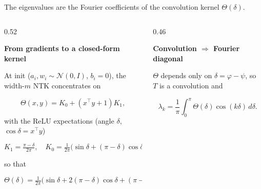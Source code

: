 \documentclass[aspectratio=169,9pt]{beamer}
\begin{document}
\begin{frame}[noframenumbering]
	{\textcolor{muted}{The eigenvalues are the Fourier coefficients of the convolution kernel $\Theta(\delta)$.}}

	\vspace{1.5mm}
	\begin{columns}[T,onlytextwidth]
		\begin{column}{0.52\textwidth}
			\begin{whitecard}[height=46mm]
				{\scriptsize\bfseries From gradients to a closed-form kernel}\par\vspace{1mm}
				{\scriptsize At init ($a_i,w_i\sim\mathcal N(0,I)$, $b_i=0$), the width-$m$ NTK concentrates on}\par\vspace{-1.5mm}
				{\scriptsize
					\[
						\Theta(x,y)=K_0+(x^\top y+1)K_1,
					\]
				}
				\vspace{-3mm}\par
				{\scriptsize with the ReLU expectations (angle $\delta$, $\cos\delta=x^\top y$)}\par\vspace{-1.5mm}
				{\scriptsize
					\[
						K_1=\tfrac{\pi-\delta}{2\pi},
						\quad
						K_0=\tfrac{1}{2\pi}\bigl(\sin\delta+(\pi-\delta)\cos\delta\bigr),
					\]
				}
				\vspace{-3mm}\par
				{\scriptsize so that}\par\vspace{-2mm}
				{\scriptsize
					\[
						\Theta(\delta)=\tfrac{1}{2\pi}\bigl(\sin\delta+2(\pi-\delta)\cos\delta+(\pi-\delta)\bigr).
					\]
				}
			\end{whitecard}
		\end{column}
		\begin{column}{0.46\textwidth}
			\begin{bluecard}[height=46mm]
				{\scriptsize\bfseries Convolution $\Rightarrow$ Fourier diagonal}\par\vspace{1mm}
				{\scriptsize $\Theta$ depends only on $\delta=\varphi-\psi$, so $T$ is a convolution and}\par\vspace{-1.5mm}
				{\scriptsize
					\[
						\lambda_k=\frac{1}{\pi}\int_0^\pi \Theta(\delta)\cos(k\delta)\,d\delta .
					\]
}
\end{bluecard}
\end{column}
\end{columns}
\end{frame}
\end{document}
